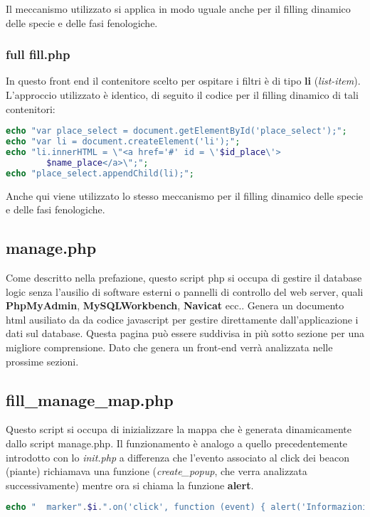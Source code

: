 Il meccanismo utilizzato si applica in modo uguale anche per il filling dinamico delle specie e delle fasi fenologiche.

\subsubsection{full fill.php}
In questo front end il contenitore scelto per ospitare i filtri è di tipo \textbf{li} (\textit{list-item}).
L'approccio utilizzato è identico, di seguito il codice per il filling dinamico di tali contenitori:
\begin{lstlisting}[language=PHP , caption = Filling Dinamico per i place - li element]
echo "var place_select = document.getElementById('place_select');";
echo "var li = document.createElement('li');";
echo "li.innerHTML = \"<a href='#' id = \'$id_place\'>
		$name_place</a>\";";
echo "place_select.appendChild(li);";
\end{lstlisting}

Anche qui viene utilizzato lo stesso meccanismo per il filling dinamico delle specie e delle fasi fenologiche.

\subsection{manage.php}
Come descritto nella prefazione, questo script php si occupa di gestire il database logic senza l'ausilio di software esterni o pannelli di controllo del web server, quali \textbf{PhpMyAdmin}, \textbf{MySQLWorkbench}, \textbf{Navicat} ecc..
\newline
Genera un documento html ausiliato da da codice javascript per gestire direttamente dall'applicazione i dati sul database. \newline Questa pagina può essere suddivisa in più sotto sezione per una migliore comprensione. Dato che genera un front-end verrà analizzata nelle prossime sezioni.

\subsection{fill\_manage\_map.php}
Questo script si occupa di inizializzare la mappa che è generata dinamicamente dallo script manage.php. Il funzionamento è analogo a quello precedentemente introdotto con lo \textit{init.php} a differenza che l'evento associato al click dei beacon (piante) richiamava una funzione (\textit{create\_popup}, che verra analizzata successivamente) mentre ora si chiama la funzione \textbf{alert}.
\begin{lstlisting}[language=PHP  ]
echo "  marker".$i.".on('click', function (event) { alert('Informazioni beacon :$beacon_info\nLatitudine: $lat\nLongitudine:$lng')}); ";
\end{lstlisting}

